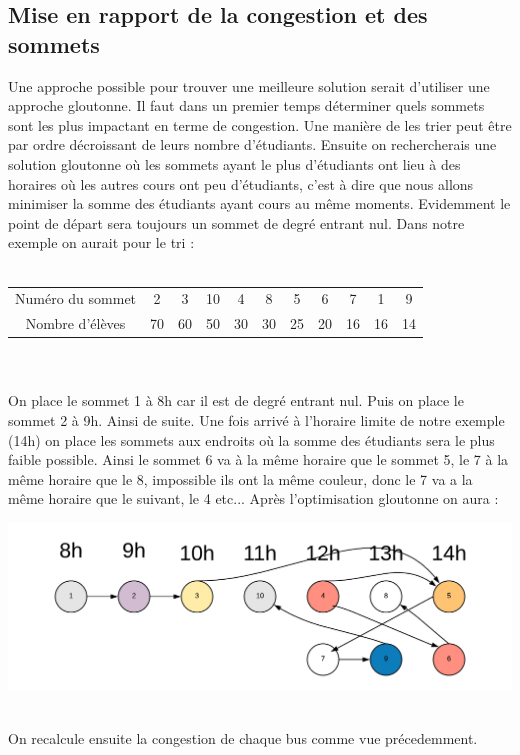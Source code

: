 \documentclass[a4paper,11pt]{article}
\begin{document}
	\subsection{Mise en rapport de la congestion et des sommets}
		Une approche possible pour trouver une meilleure solution serait d'utiliser une approche gloutonne.
		Il faut dans un premier temps déterminer quels sommets sont les plus impactant en terme de congestion. Une manière de les trier peut être par ordre décroissant de leurs nombre d'étudiants. Ensuite on rechercherais une solution gloutonne où les sommets ayant le plus d'étudiants ont lieu à des horaires où les autres cours ont peu d'étudiants, c'est à dire que nous allons minimiser la somme des étudiants ayant cours au même moments. Evidemment le point de départ sera toujours un sommet de degré entrant nul. Dans notre exemple on aurait pour le tri : \\
		\\
		\begin{tabular}{ | c | c | c | c | c | c | c | c | c | c | c |}
 			\hline			
   			Numéro du sommet & 2 & 3 & 10 & 4 & 8 & 5 & 6 & 7 & 1 & 9\\
   			Nombre d'élèves & 70 & 60 & 50 & 30 & 30 & 25 & 20 & 16 & 16 & 14\\
 			\hline  
 		\end{tabular}\\	
 		\\
 		On place le sommet 1 à 8h car il est de degré entrant nul. Puis on place le sommet 2 à 9h. Ainsi de suite. Une fois arrivé à l'horaire limite de notre exemple (14h) on place les sommets aux endroits où la somme des étudiants sera le plus faible possible. Ainsi le sommet 6 va à la même horaire que le sommet 5, le 7 à la même horaire que le 8, impossible ils ont la même couleur, donc le 7 va a la même horaire que le suivant, le 4 etc...
 		Après l'optimisation gloutonne on aura : \\
 		\centerline{\includegraphics[scale=0.8]{Captures/exemple5.png}}\\
 		On recalcule ensuite la congestion de chaque bus comme vue précedemment.
\end{document}
